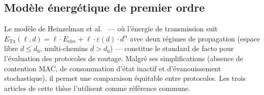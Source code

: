 \begin{table}[htbp]
\centering
\caption{Comparaison des protocoles de routage hiérarchique pour WSN. PDR~: Packet Delivery Ratio. DV~: durée de vie.}
\label{tab:routing-comparison}
\end{table}

\subsection{Modèle énergétique de premier ordre}

Le modèle de Heinzelman et al.\ \cite{heinzelman2000leach} --- où l'énergie de transmission suit $E_{\text{Tx}}(\ell, d) = \ell \cdot E_{\text{elec}} + \ell \cdot \varepsilon(d) \cdot d^\alpha$ avec deux régimes de propagation (espace libre $d \leq d_0$, multi-chemins $d > d_0$) --- constitue le standard de facto pour l'évaluation des protocoles de routage. Malgré ses simplifications (absence de contention MAC, de consommation d'état inactif et d'évanouissement stochastique), il permet une comparaison équitable entre protocoles. Les trois articles de cette thèse l'utilisent comme référence commune.

